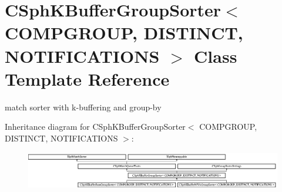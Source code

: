 \hypertarget{classCSphKBufferGroupSorter}{\section{C\-Sph\-K\-Buffer\-Group\-Sorter$<$ C\-O\-M\-P\-G\-R\-O\-U\-P, D\-I\-S\-T\-I\-N\-C\-T, N\-O\-T\-I\-F\-I\-C\-A\-T\-I\-O\-N\-S $>$ Class Template Reference}
\label{classCSphKBufferGroupSorter}
}


match sorter with k-\/buffering and group-\/by  


Inheritance diagram for C\-Sph\-K\-Buffer\-Group\-Sorter$<$ C\-O\-M\-P\-G\-R\-O\-U\-P, D\-I\-S\-T\-I\-N\-C\-T, N\-O\-T\-I\-F\-I\-C\-A\-T\-I\-O\-N\-S $>$\-:\begin{figure}[H]
\begin{center}
\leavevmode
\includegraphics[height=1.602289cm]{classCSphKBufferGroupSorter}
\end{center}
\end{figure}
